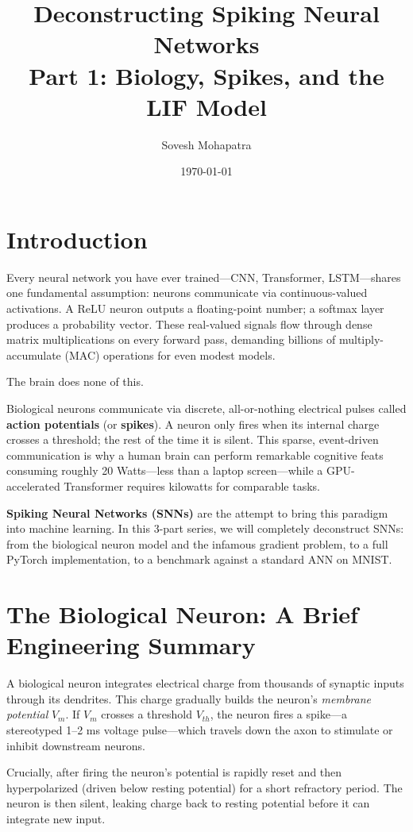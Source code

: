 \documentclass[12pt]{article}
\title{\textbf{Deconstructing Spiking Neural Networks \\ Part 1: Biology, Spikes, and the LIF Model}}
\author{Sovesh Mohapatra}
\date{\today}
\begin{document}
\maketitle

\section*{Introduction}
Every neural network you have ever trained—CNN, Transformer, LSTM—shares one fundamental assumption: neurons communicate via continuous-valued activations. A ReLU neuron outputs a floating-point number; a softmax layer produces a probability vector. These real-valued signals flow through dense matrix multiplications on every forward pass, demanding billions of multiply-accumulate (MAC) operations for even modest models.

The brain does none of this.

Biological neurons communicate via discrete, all-or-nothing electrical pulses called \textbf{action potentials} (or \textbf{spikes}). A neuron only fires when its internal charge crosses a threshold; the rest of the time it is silent. This sparse, event-driven communication is why a human brain can perform remarkable cognitive feats consuming roughly 20 Watts—less than a laptop screen—while a GPU-accelerated Transformer requires kilowatts for comparable tasks.

\textbf{Spiking Neural Networks (SNNs)} are the attempt to bring this paradigm into machine learning. In this 3-part series, we will completely deconstruct SNNs: from the biological neuron model and the infamous gradient problem, to a full PyTorch implementation, to a benchmark against a standard ANN on MNIST.

\section*{The Biological Neuron: A Brief Engineering Summary}
A biological neuron integrates electrical charge from thousands of synaptic inputs through its dendrites. This charge gradually builds the neuron's \textit{membrane potential} $V_m$. If $V_m$ crosses a threshold $V_{th}$, the neuron fires a spike—a stereotyped 1–2 ms voltage pulse—which travels down the axon to stimulate or inhibit downstream neurons.

Crucially, after firing the neuron's potential is rapidly reset and then hyperpolarized (driven below resting potential) for a short refractory period. The neuron is then silent, leaking charge back to resting potential before it can integrate new input.
\end{document}

